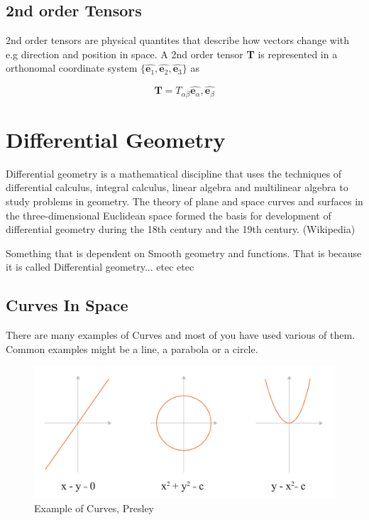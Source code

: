 \subsection{2nd order Tensors}
2nd order tensors are physical quantites that describe how vectors change with e.g direction and position in space. A 2nd order tensor \textbf{T} is represented in a orthonomal coordinate system $\{\hat{\textbf{e}_1},\hat{\textbf{e}_2} , \hat{\textbf{e}_3}\}$ as

\begin{equation}
\textbf{T} = T_{\alpha\beta}\hat{\textbf{e}_\alpha},\hat{\textbf{e}_\beta}
\end{equation}


\section{Differential Geometry}

Differential geometry is a mathematical discipline that uses the techniques of differential calculus, integral calculus, linear algebra and multilinear algebra to study problems in geometry. The theory of plane and space curves and surfaces in the three-dimensional Euclidean space formed the basis for development of differential geometry during the 18th century and the 19th century. (Wikipedia)

Something that is dependent on Smooth geometry and functions. That is because it is called Differential geometry... etec etec 


\newcommand{\upperRomannumeral}[1]{\uppercase\expandafter{\romannumeral#1}}
\newcommand{\lowerromannumeral}[1]{\romannumeral#1\relax}



\subsection{Curves In Space}
There are many examples of Curves and most of you have used various of them. Common examples might be a line, a parabola or a circle. 


\begin{figure}[H]
\centering
\includegraphics[width=0.9\linewidth ]{figure/Theory/CurveExample.pdf}  \caption{Example of Curves, Presley }
\end{figure}

